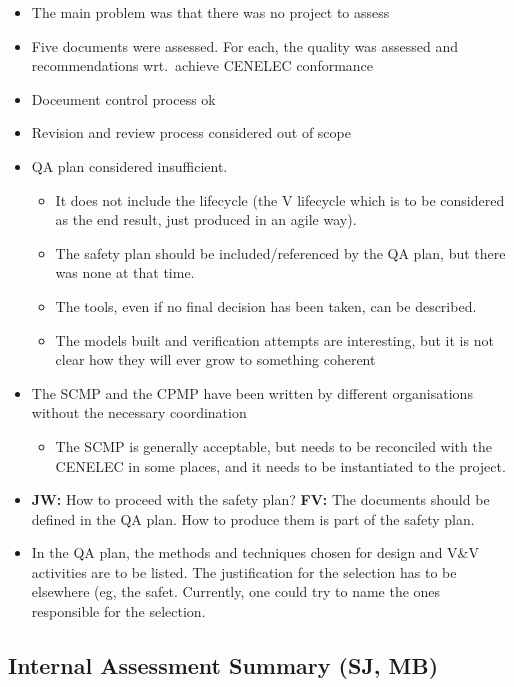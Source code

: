 \documentclass[a4paper,german]{article}
\begin{document}
\begin{itemize}
\item The main problem was that there was no project to assess
\item Five documents were assessed. For each, the quality was assessed
  and recommendations wrt.\ achieve CENELEC conformance
\item Doceument control process ok
\item Revision and review process considered out of scope
\item QA plan considered insufficient.
  \begin{itemize}
  \item It does not include the
  lifecycle (the V lifecycle which is to be considered as the end
  result, just produced in an agile way).
  \item The safety plan should be included/referenced by the QA plan,
  but there was none at that time.
  \item The tools, even if no final decision has been taken, can be described.
  \item The models built and verification attempts are interesting,
    but it is not clear how they will ever grow to something coherent
  \end{itemize}
\item The SCMP and the CPMP have been written by different
  organisations without the necessary coordination
  \begin{itemize}
  \item The SCMP is generally acceptable, but needs to be reconciled
    with the CENELEC in some places, and it needs to be instantiated
    to the project. 
  \end{itemize}
\item \textbf{JW:} How to proceed with the safety plan? \textbf{FV:}
  The documents should be defined in the QA plan. How to produce them
  is part of the safety plan.
\item In the QA plan, the methods and techniques chosen for design and V\&V
  activities are to be listed. The justification for the selection has
  to be elsewhere (eg, the safet. Currently, one could try to name the
  ones responsible for the selection. 
\end{itemize}

\subsection{Internal Assessment Summary (SJ, MB)}
\label{sec:intern-assessm-summ}
\end{document}
